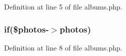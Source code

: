 Definition at line 5 of file albums.\+php.

\subsubsection[{\texorpdfstring{if}{if}}]{\setlength{\rightskip}{0pt plus 5cm}if(\$photos-\/$>$photos)}\hypertarget{pages_2albums_8php_a5aed7d5753c8d4e84a25f746413591b9}{}\label{pages_2albums_8php_a5aed7d5753c8d4e84a25f746413591b9}


Definition at line 8 of file albums.\+php.

